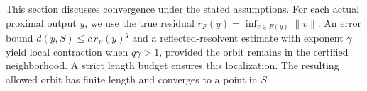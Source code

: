 \documentclass{article}
\begin{document}
This section discusses convergence under the stated assumptions.
For each actual proximal output $y$, we use the true residual $r_F(y)=\inf_{v\in F(y)}\|v\|$.
An error bound $d(y,S)\le c\,r_F(y)^q$ and a reflected-resolvent estimate with exponent $\gamma$ yield local contraction when $q\gamma>1$, provided the orbit remains in the certified neighborhood.
A strict length budget ensures this localization. The resulting allowed orbit has finite length and converges to a point in $S$.
\end{document}

